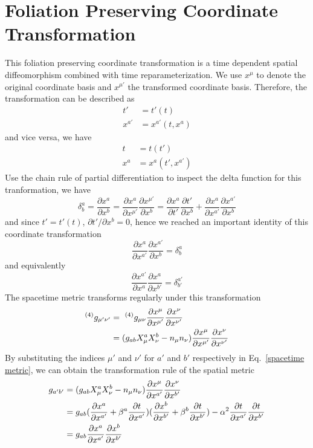 \documentclass[letterpaper,nofootinbib,prd,amsmath,onecolumn]{revtex4-1}
\begin{document}
\section{Foliation Preserving Coordinate Transformation}\label{transform}
This foliation preserving coordinate transformation is a time dependent spatial diffeomorphism combined with time reparameterization. We use $x^{\mu}$ to denote the original coordinate basis and $x^{\mu'}$ the transformed coordinate basis. Therefore, the transformation can be described as
\begin{align*}
t' & = t'(t)\\
x^{a'} & = x^{a'}(t,x^{a})
\end{align*}
and vice versa, we have
\begin{align*}
t & = t(t')\\
x^{a} & = x^{a}(t',x^{a'})
\end{align*}
Use the chain rule of partial differentiation to inspect the delta function for this tranformation, we have
\[
\delta^{a}_{b} = \frac{\partial x^{a}}{\partial x^{b}} = \frac{\partial x^{a}}{\partial x^{\mu'}}\frac{\partial x^{\mu'}}{\partial x^{b}} = \frac{\partial x^{a}}{\partial t'}\frac{\partial t'}{\partial x^{b}} + \frac{\partial x^{a}}{\partial x^{a'}}\frac{\partial x^{a'}}{\partial x^{b}}
\]
and since $t' = t'(t)$, $\partial t'/\partial x^{b} = 0$, hence we reached an important identity of this coordinate transformation
\begin{equation}
\frac{\partial x^{a}}{\partial x^{a'}}\frac{\partial x^{a'}}{\partial x^{b}} = \delta^{a}_{b}
\end{equation}
and equivalently
\begin{equation}
\frac{\partial x^{a'}}{\partial x^{a}}\frac{\partial x^{a}}{\partial x^{b'}} = \delta^{a'}_{b'}
\end{equation}
The spacetime metric transforms regularly under this transformation
\begin{align}\label{spacetime metric}
^{(4)}g_{\mu'\nu'} &=~^{(4)}g_{\mu\nu}\frac{\partial x^{\mu}}{\partial x^{\mu'}}\frac{\partial x^{\nu}}{\partial x^{\nu'}}\notag\\
& = (g_{ab}X^{a}_{\mu}X^{b}_{\nu} - n_{\mu}n_{\nu})\frac{\partial x^{\mu}}{\partial x^{\mu'}}\frac{\partial x^{\nu}}{\partial x^{\nu'}}
\end{align}
By substituting the indices $\mu'$ and $\nu'$ for $a'$ and $b'$ respectively in Eq.~\ref{spacetime metric}, we can obtain the transformation rule of the spatial metric
\begin{align}
g_{a'b'} & = (g_{ab}X^{a}_{\mu}X^{b}_{\nu} - n_{\mu}n_{\nu})\frac{\partial x^{\mu}}{\partial x^{a'}}\frac{\partial x^{\nu}}{\partial x^{b'}}\notag\\
&= g_{ab}(\frac{\partial x^{a}}{\partial x^{a'}} + \beta^{a}\frac{\partial t}{\partial x^{a'}})(\frac{\partial x^{b}}{\partial x^{b'}} + \beta^{b}\frac{\partial t}{\partial x^{b'}}) - \alpha^2\frac{\partial t}{\partial x^{a'}}\frac{\partial t}{\partial x^{b'}}\notag\\
& = g_{ab}\frac{\partial x^{a}}{\partial x^{a'}}\frac{\partial x^{b}}{\partial x^{b'}}
\end{align}
\end{document}
